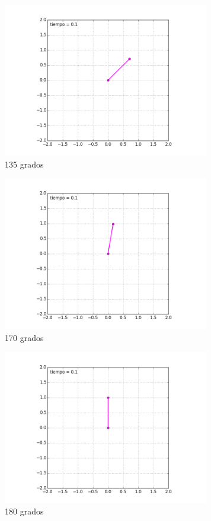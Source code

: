 \documentclass[12pt]{article}
\begin{document}
\begin{figure}[H]
		\centering
	\includegraphics[width=9cm]{135.png}
	\caption{135 grados}
\end{figure}

\begin{figure}[H]
		\centering
	\includegraphics[width=9cm]{170.png}
	\caption{170 grados}
\end{figure}

\begin{figure}[H]
		\centering
	\includegraphics[width=9cm]{180.png}
	\caption{180 grados}
\end{figure}
\end{document}
